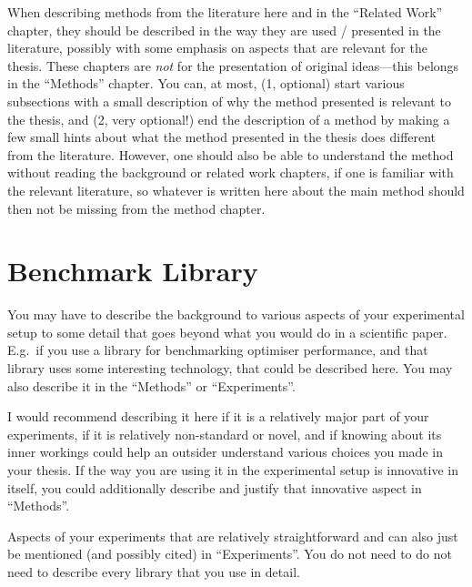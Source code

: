 When describing methods from the literature here and in the ``Related Work'' chapter, they should be described in the way they are used / presented in the literature, possibly with some emphasis on aspects that are relevant for the thesis.
These chapters are \emph{not} for the presentation of original ideas---this belongs in the ``Methods'' chapter.
You can, at most, (1, optional) start various subsections with a small description of why the method presented is relevant to the thesis, and (2, very optional!) end the description of a method by making a few small hints about what the method presented in the thesis does different from the literature.
However, one should also be able to understand the method without reading the background or related work chapters, if one is familiar with the relevant literature, so whatever is written here about the main method should then not be missing from the method chapter.

\section{Benchmark Library}

You may have to describe the background to various aspects of your experimental setup to some detail that goes beyond what you would do in a scientific paper.
E.g.\ if you use a library for benchmarking optimiser performance, and that library uses some interesting technology, that could be described here.
You may also describe it in the ``Methods'' or ``Experiments''.

I would recommend describing it here if it is a relatively major part of your experiments, if it is relatively non-standard or novel, and if knowing about its inner workings could help an outsider understand various choices you made in your thesis.
If the way you are using it in the experimental setup is innovative in itself, you could additionally describe and justify that innovative aspect in ``Methods''.

Aspects of your experiments that are relatively straightforward and can also just be mentioned (and possibly cited) in ``Experiments''.
You do not need to do not need to describe every library that you use in detail.
